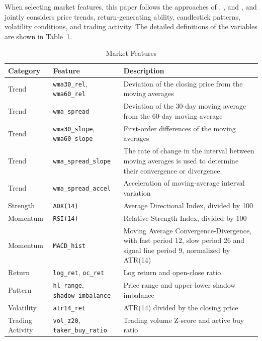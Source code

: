 \documentclass[12pt]{article}
\begin{document}
When selecting market features, this paper follows the approaches of \citet{FischerKrauss2018}, 
\citet{HuangWanZhangLu2024}, and \citet{AlKhatibEtAl2022}, and jointly considers price trends, 
return-generating ability, candlestick patterns, volatility conditions, and trading activity. 
The detailed definitions of the variables are shown in Table~\ref{tab:market_features}.

\begin{table}[H]
\centering
\caption{Market Features}
\label{tab:market_features}
\small
\renewcommand{\arraystretch}{1.2}
\begin{tabular}{p{}p{}p{}}
\toprule
Category & Feature & Description \\
\midrule
Trend &
\texttt{wma30\_rel}, \texttt{wma60\_rel} &
Deviation of the closing price from the moving averages \\
Trend &
\texttt{wma\_spread} &
Deviation of the 30-day moving average from the 60-day moving average \\
Trend &
\texttt{wma30\_slope}, \texttt{wma60\_slope} &
First-order differences of the moving averages \\
Trend &
\texttt{wma\_spread\_slope} &
The rate of change in the interval between moving averages is used 
to determine their convergence or divergence. \\
Trend &
\texttt{wma\_spread\_accel} &
Acceleration of moving‑average interval variation \\
Strength &
\texttt{ADX(14)} &
Average Directional Index, divided by 100 \\
Momentum &
\texttt{RSI(14)} &
Relative Strength Index, divided by 100 \\
Momentum &
\texttt{MACD\_hist} &
Moving Average Convergence‑Divergence, with fast period 12, slow period 26 and signal 
line period 9, normalized by ATR(14)\\
Return &
\texttt{log\_ret}, \texttt{oc\_ret} &
Log return and open-close ratio \\
Pattern &
\texttt{hl\_range}, \texttt{shadow\_imbalance} &
Price range and upper-lower shadow imbalance \\
Volatility &
\texttt{atr14\_ret} &
ATR(14) divided by the closing price \\
Trading Activity &
\texttt{vol\_z20}, \texttt{taker\_buy\_ratio} &
Trading volume Z-score and active buy ratio \\
\bottomrule
\end{tabular}
\end{table}
\end{document}

